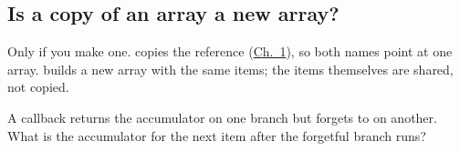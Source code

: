 \subsection{Is a copy of an array a new array?}%
Only if you make one.  copies the reference (\hyperref[ch:c01]{Ch.~1}), so both names point at one array. \code{[...a]} builds a new array with the same items; the items themselves are shared, not copied.

\begin{ponder}A  callback returns the accumulator on one branch but forgets to on another. What is the accumulator for the next item after the forgetful branch runs?\end{ponder}
